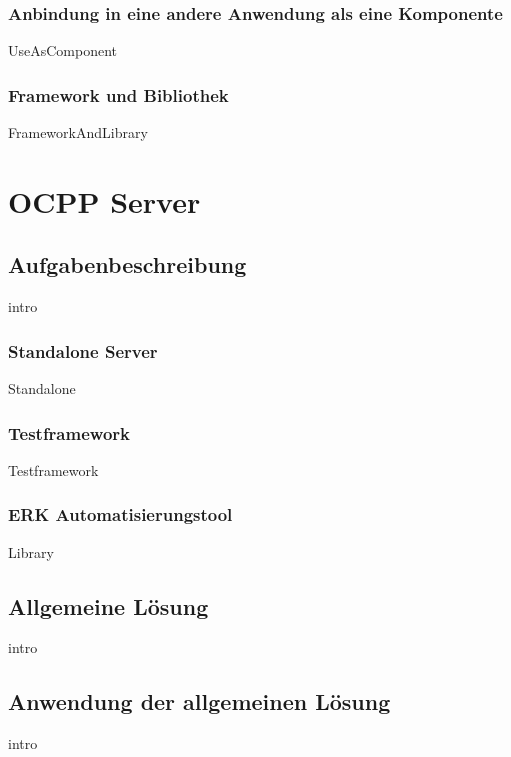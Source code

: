 \documentclass{article}
\begin{document}
        \subsubsection{Anbindung in eine andere Anwendung als eine Komponente}
            {UseAsComponent}

        \newpage
        \subsubsection{Framework und Bibliothek}
            {FrameworkAndLibrary}
\newpage



\section{OCPP Server}
    \subsection{Aufgabenbeschreibung}
        {intro}
        \subsubsection{Standalone Server}
            {Standalone}
        \subsubsection{Testframework}
            {Testframework}
        \subsubsection{ERK Automatisierungstool}
            {Library}
    \newpage
    \subsection{Allgemeine Lösung}
        {intro}

    \newpage
    \subsection{Anwendung der allgemeinen Lösung}
        {intro}
        
\end{document}
